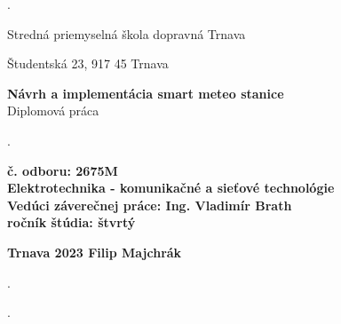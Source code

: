 \begin{titlepage}
    \phantom.
    
    \bigskip
    
    \begin{center}
    {\sc\LARGE Stredná priemyselná škola dopravná Trnava}
    \bigskip
    
    {\sc\large Študentská 23, 917 45 Trnava}
    \break
    \end{center}
    \vspace{4.5cm}
    
    \begin{center}
    
    {\sc\Large{\bf Návrh a implementácia smart meteo stanice\\}}
    \medskip
    {\sc\large Diplomová práca}
    
    \end{center}
    
    
    \vspace{3cm}
    
    
    
    \phantom.\hfill
    
    {\noindent\sc\small\bf č. odboru: 2675M \\}
    {\sc\small\bf Elektrotechnika - komunikačné a sieťové technológie \\}
    {\sc\small\bf Vedúci záverečnej práce: Ing. Vladimír Brath\\ }
    {\sc\small\bf ročník štúdia: štvrtý\\ }
    
    \medskip
     
    \hfill
    \large\bf Trnava 2023
    \hfill
    \large\bf Filip Majchrák
    
    \hfill\phantom.
    
    
    \phantom.
    \end{titlepage}